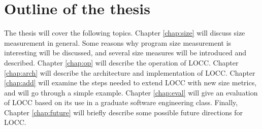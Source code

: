 \section{Outline of the thesis}

The thesis will cover the following topics.  Chapter \ref{chap:size} will
discuss size measurement in general.  Some reasons why program size
measurement is interesting will be discussed, and several size measures
will be introduced and described.  Chapter \ref{chap:op} will describe the
operation of LOCC. Chapter \ref{chap:arch} will describe the architecture
and implementation of LOCC.  Chapter \ref{chap:add} will examine the steps
needed to extend LOCC with new size metrics, and will go through a simple
example.  Chapter \ref{chap:eval} will give an evaluation of LOCC based on
its use in a graduate software engineering class.  Finally, Chapter
\ref{chap:future} will briefly describe some possible future directions for
LOCC.



